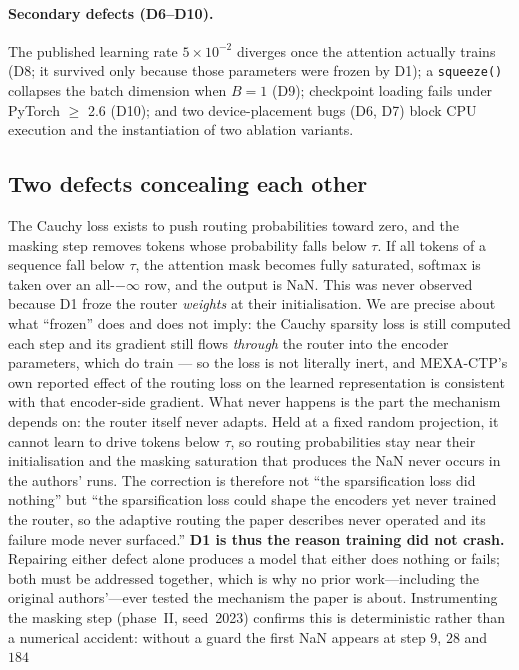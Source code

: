\documentclass[a4paper,fleqn]{cas-sc}
\begin{document}
\paragraph{Secondary defects (D6--D10).} The published learning rate $5\times10^{-2}$ diverges
once the attention actually trains (D8; it survived only because those parameters were frozen
by D1); a \texttt{squeeze()} collapses the batch dimension when $B=1$ (D9); checkpoint loading
fails under PyTorch $\geq$ 2.6 (D10); and two device-placement bugs (D6, D7) block CPU
execution and the instantiation of two ablation variants.
\subsection{Two defects concealing each other}
\label{sec:twobugs}
The Cauchy loss exists to push routing probabilities toward zero, and the masking step
removes tokens whose probability falls below $\tau$. If all tokens of a sequence fall below
$\tau$, the attention mask becomes fully saturated, softmax is taken over an all-$-\infty$
row, and the output is NaN. This was never observed because D1 froze the router
\emph{weights} at their initialisation. We are precise about what ``frozen'' does and does not
imply: the Cauchy sparsity loss is still computed each step and its gradient still flows
\emph{through} the router into the encoder parameters, which do train --- so the loss is not
literally inert, and MEXA-CTP's own reported effect of the routing loss on the learned
representation is consistent with that encoder-side gradient. What never happens is the part
the mechanism depends on: the router itself never adapts. Held at a fixed random projection,
it cannot learn to drive tokens below $\tau$, so routing probabilities stay near their
initialisation and the masking saturation that produces the NaN never occurs in the authors'
runs. The correction is therefore not ``the sparsification loss did nothing'' but ``the
sparsification loss could shape the encoders yet never trained the router, so the adaptive
routing the paper describes never operated and its failure mode never surfaced.''
\textbf{D1 is thus the reason training did not crash.} Repairing either defect alone
produces a model that either does nothing or fails; both must be addressed together, which
is why no prior work---including the original authors'---ever tested the mechanism the
paper is about.
Instrumenting the masking step (phase~II, seed~2023) confirms this is deterministic rather
than a numerical accident: without a guard the first NaN appears at step $9$, $28$ and $184$
\end{document}
